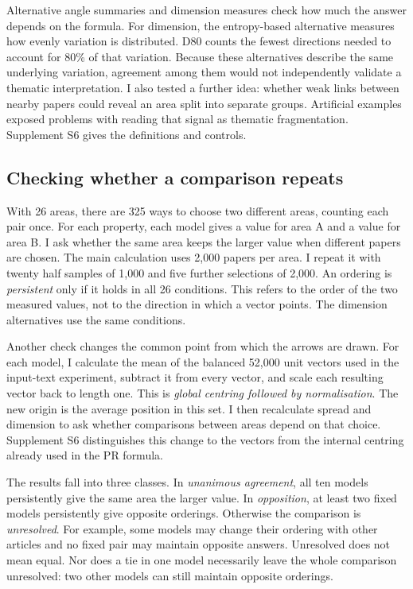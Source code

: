 \documentclass[12pt]{article}
\begin{document}
Alternative angle summaries and dimension measures check how much the answer depends on the formula. For dimension, the entropy-based alternative measures how evenly variation is distributed. D80 counts the fewest directions needed to account for 80\% of that variation. Because these alternatives describe the same underlying variation, agreement among them would not independently validate a thematic interpretation. I also tested a further idea: whether weak links between nearby papers could reveal an area split into separate groups. Artificial examples exposed problems with reading that signal as thematic fragmentation. Supplement S6 gives the definitions and controls.

\subsection{Checking whether a comparison repeats}
With 26 areas, there are 325 ways to choose two different areas, counting each pair once. For each property, each model gives a value for area A and a value for area B. I ask whether the same area keeps the larger value when different papers are chosen. The main calculation uses 2,000 papers per area. I repeat it with twenty half samples of 1,000 and five further selections of 2,000. An ordering is \emph{persistent} only if it holds in all 26 conditions. This refers to the order of the two measured values, not to the direction in which a vector points. The dimension alternatives use the same conditions.

Another check changes the common point from which the arrows are drawn. For each model, I calculate the mean of the balanced 52,000 unit vectors used in the input-text experiment, subtract it from every vector, and scale each resulting vector back to length one. This is \emph{global centring followed by normalisation}. The new origin is the average position in this set. I then recalculate spread and dimension to ask whether comparisons between areas depend on that choice. Supplement S6 distinguishes this change to the vectors from the internal centring already used in the PR formula.

The results fall into three classes. In \emph{unanimous agreement}, all ten models persistently give the same area the larger value. In \emph{opposition}, at least two fixed models persistently give opposite orderings. Otherwise the comparison is \emph{unresolved}. For example, some models may change their ordering with other articles and no fixed pair may maintain opposite answers. Unresolved does not mean equal. Nor does a tie in one model necessarily leave the whole comparison unresolved: two other models can still maintain opposite orderings.
\end{document}
